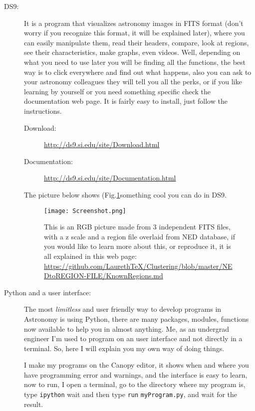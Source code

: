 \documentclass[11pt,fleqn]{book} %
\begin{document}
\begin{description}
	\item[DS9:] It is a program that visualizes astronomy images in FITS format (don't worry if you recognize this format, it will be explained later), where you can easily manipulate them, read their headers, compare, look at regions, see their characteristics, make graphs, even videos. Well, depending on what you need to use later you will be finding all the functions, the best way is to click everywhere and find out what happens, also you can ask to your astronomy colleagues they will tell you all the perks, or if you like learning by yourself or you need something specific check the documentation web page. It is fairly easy to install, just follow the instructions.
    	\begin{description}
        	\item[Download: ]\url{http://ds9.si.edu/site/Download.html}
            \item[Documentation: ]\url{http://ds9.si.edu/site/Documentation.html}
        \end{description}
        The picture below shows (Fig.\ref{fig:screen}something cool you can do in DS9.
        \begin{figure}[h]
        	\centering
    \texttt{[image: Screenshot.png]}
    \caption{This is an RGB picture made from 3 independent FITS files, with a z scale and a region file overlaid from NED database, if you would like to learn more about this, or reproduce it, it is all explained in this web page: \url{https://github.com/LaurethTeX/Clustering/blob/master/NEDtoREGION-FILE/KnownRegions.md}}
    \label{fig:screen}
        \end{figure}
        
    \item[Python and a user interface: ]The most \emph{limitless} and user friendly way to develop programs in Astronomy is using Python, there are many packages, modules, functions now available to help you in almost anything. Me, as an undergrad engineer I'm used to program on an user interface and not directly in a terminal. So, here I will explain you my own way of doing things.
    
    I make my programs on the Canopy editor, it shows when and where you have programming error and warnings, and the interface is easy to learn, now to run, I open a terminal, go to the directory where my program is, type \verb|ipython| wait and then type \verb|run| \verb|myProgram.py|, and wait for the result.
    

\end{description}
\end{document}

